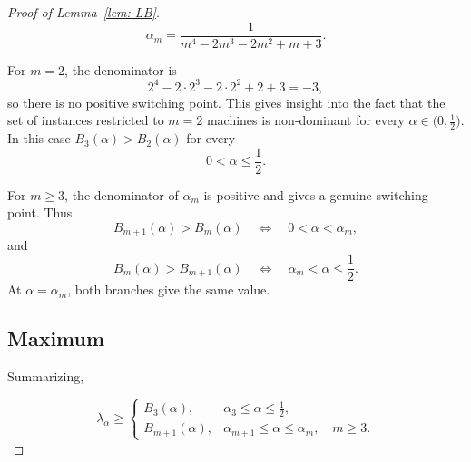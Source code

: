 \documentclass[%
english, titlepage=false %
]{./tum-templates/book/tumbook}
\begin{document}
\begin{proof}[\hypertarget{proof:LB}{Proof of Lemma~\ref{lem: LB}}]
\[
\boxed{
        \alpha_m=
        \frac{1}{m^4-2m^3-2m^2+m+3}
        .}
\]

For \(m=2\), the denominator is
\[
        2^4-2\cdot 2^3-2\cdot 2^2+2+3
        =
        -3,
\]
so there is no positive switching point. This gives insight
into the fact that the set of instances restricted to $m=2$ machines
is non-dominant for every $\alpha \in \Big(0,\frac12\Big)$.
In this case \(B_3(\alpha)>B_2(\alpha)\) for every
\[
        0<\alpha\leq \frac12.
\]

For \(m\geq 3\), the denominator of $\alpha_m$ is positive and gives a genuine switching point. Thus
\[
        B_{m+1}(\alpha)>B_m(\alpha)
        \quad\Longleftrightarrow\quad
        0<\alpha<\alpha_m,
\]
and
\[
        B_m(\alpha)>B_{m+1}(\alpha)
        \quad\Longleftrightarrow\quad
        \alpha_m<\alpha\leq \frac12.
\]
At \(\alpha=\alpha_m\), both branches give the same value.

\subsection*{Maximum}\label{subsec: max Lbound}
Summarizing,

\[
\boxed{
\lambda_{\alpha} \ge
\begin{cases}
B_3(\alpha),
& \displaystyle \alpha_3\leq\alpha\leq\frac12,\\[6pt]
B_{m+1}(\alpha),
& \alpha_{m+1}\leq\alpha \le \alpha_{m},\quad m\geq 3.
\end{cases}
}
\]
\end{proof}
\backmatter{}
\listoffigures
\printbibliography[heading=bibintoc]
\end{document}
